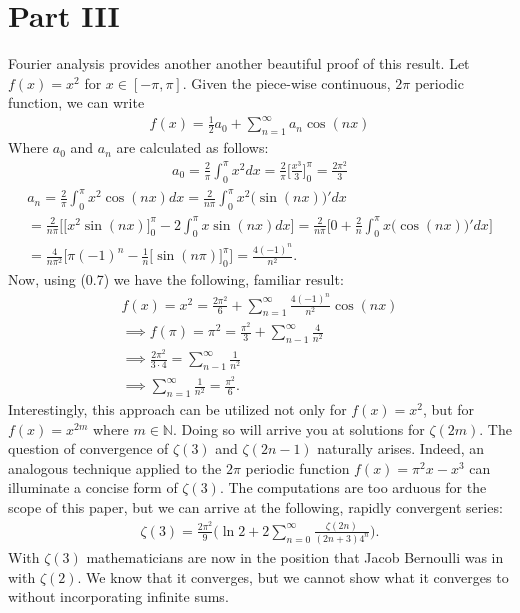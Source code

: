 \documentclass[12pt,oneside]{amsart}
\theoremstyle{definition}
\theoremstyle{remark}
\numberwithin{equation}{exer}
\begin{document}
\section*{Part III}
\newline \indent 
Fourier analysis provides another another beautiful proof of this result. Let $f(x) = x^2$ for $x \in [-\pi,\pi]$.  Given the piece-wise continuous, $2\pi$ periodic function, we can write \begin{align}
    f(x) = \frac{1}{2}a_0 + \sum_{n=1}^\infty a_n \cos{(nx)}
\end{align}
Where $a_0$ and $a_n$ are calculated as follows:
\begin{align*}
    a_0 = \frac{2}{\pi}\int_0^\pi x^2 dx = \frac{2}{\pi} \bigg[\frac{x^3}{3}  \bigg]_0^\pi = \frac{2\pi^2}{3}  
\end{align*}
\begin{align*}
    a_n = \frac{2}{\pi} \int_0^\pi x^2 \cos{(nx)}dx 
    = \frac{2}{n\pi} \int_0^\pi x^2 \Big(\sin{(nx)}\Big)'dx\\
    =\frac{2}{n\pi} \Bigg[\Big[x^2\sin{(nx)}\Big]_0^\pi -2 \int_0^\pi x\sin{(nx)}dx\Bigg]
    = \frac{2}{n\pi} \Bigg[ 0 + \frac{2}{n} \int_0^\pi x\Big(\cos{(nx)}\Big)'dx\Bigg]\\
    =\frac{4}{n\pi^2} \Bigg[ \pi(-1)^n - \frac{1}{n}\Big[\sin{(n\pi)}\Big]_0^\pi\Bigg] 
    = \frac{4(-1)^n}{n^2}.
\end{align*}
Now, using (0.7) we have the following, familiar result:
\begin{align*}
    f(x)=x^2= \frac{2\pi^2}{6} + \sum_{n=1}^\infty \frac{4(-1)^n}{n^2} \cos{(nx)}\\
    \implies f(\pi) = \pi^2 =\frac{\pi^2}{3} + \sum_{n-1}^{\infty} \frac{4}{n^2}\\
    \implies \frac{2 \pi^2}{3 \cdot 4} =\sum_{n-1}^{\infty} \frac{1}{n^2}\\
    \implies \sum_{n=1}^\infty \frac{1}{n^2} = \frac{\pi^2}{6}. 
\end{align*}
\indent
Interestingly, this approach can be utilized not only for $f(x)= x^2$, but for $f(x) = x^{2m}$ where $m \in \mathbb{N}$. Doing so will arrive you at solutions for $\zeta(2m)$. The question of convergence of $\zeta(3)$ and $\zeta(2n-1)$ naturally arises. 
\indent Indeed, an analogous technique applied to the $2\pi$ periodic function $f(x)= \pi^2x - x^3$ can illuminate a concise form of $\zeta(3)$. The computations are too arduous for the scope of this paper, but we can arrive at the following, rapidly convergent series:
\begin{align*}
    \zeta(3) = \frac{{2\pi}^2}{9}\Bigg(\ln{2} + 2 \sum_{n=0}^\infty \frac{\zeta(2n)}{(2n+3)4^n}\Bigg).
\end{align*}
With $\zeta(3)$ mathematicians are now in the position that Jacob Bernoulli was in with $\zeta(2)$. We know that it converges, but we cannot show what it converges to without incorporating infinite sums. \cite{MR2793174}
\end{document}
